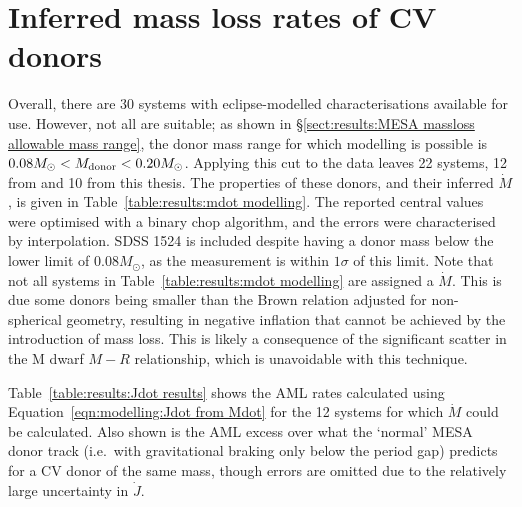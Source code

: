 \section{Inferred mass loss rates of CV donors}
Overall, there are 30 systems with eclipse-modelled characterisations available for use.
However, not all are suitable; as shown in \S\ref{sect:results:MESA massloss allowable mass range}, the donor mass range for which modelling is possible is $0.08 M_\odot < M_{\rm donor} < 0.20 M_\odot$.
Applying this cut to the data leaves 22 systems, 12 from \citet{McAllister2019} and 10 from this thesis.
The properties of these donors, and their inferred $\dot M$, is given in Table~\ref{table:results:mdot modelling}. The reported central values were optimised with a binary chop algorithm, and the errors were characterised by interpolation. SDSS 1524 is included despite having a donor mass below the lower limit of $0.08 M_\odot$, as the measurement is within $1\sigma$ of this limit.
Note that not all systems in Table~\ref{table:results:mdot modelling} are assigned a $\dot M$. This is due some donors being smaller than the Brown relation adjusted for non-spherical geometry, resulting in negative inflation that cannot be achieved by the introduction of mass loss.
This is likely a consequence of the significant scatter in the M dwarf $M - R$ relationship, which is unavoidable with this technique.

Table~\ref{table:results:Jdot results} shows the AML rates calculated using Equation~\ref{eqn:modelling:Jdot from Mdot} for the 12 systems for which $\dot M$ could be calculated. Also shown is the AML excess over what the `normal' MESA donor track (i.e.\ with gravitational braking only below the period gap) predicts for a CV donor of the same mass, though errors are omitted due to the relatively large uncertainty in $\dot J$.



